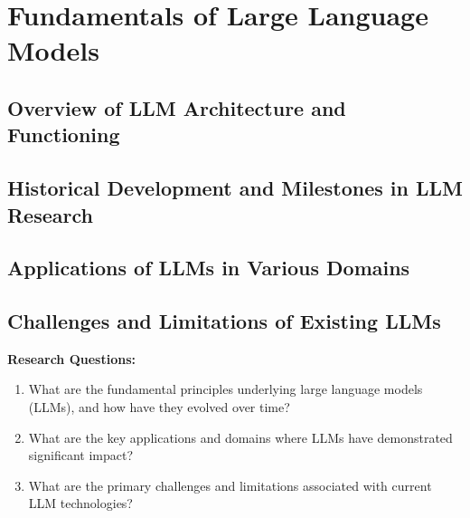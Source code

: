 
\chapter{Fundamentals of Large Language Models}
\label{chap:fundamentals}
\pagestyle{fancy}

\section{Overview of LLM Architecture and Functioning}

\section{Historical Development and Milestones in LLM Research}

\section{Applications of LLMs in Various Domains}

\section{Challenges and Limitations of Existing LLMs}

\textbf{Research Questions:}
\begin{enumerate}
    \item What are the fundamental principles underlying large language models (LLMs), and how have they evolved over time?
    \item What are the key applications and domains where LLMs have demonstrated significant impact?
    \item What are the primary challenges and limitations associated with current LLM technologies?
\end{enumerate}
